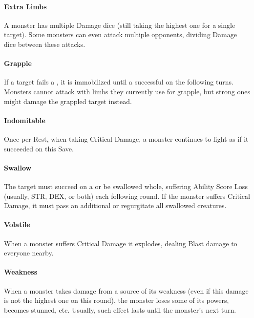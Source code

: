 \documentclass[itdr]{subfiles}
\begin{document}
\paragraph{Extra Limbs}
A monster has multiple Damage dice (still taking the highest one for a single target). Some monsters can even attack multiple opponents, dividing Damage dice between these attacks.

\paragraph{Grapple}
If a target fails a , it is immobilized until a successful  on the following turns. Monsters cannot attack with limbs they currently use for grapple, but strong ones might damage the grappled target instead.

\paragraph{Indomitable}
Once per Rest, when taking Critical Damage, a monster continues to fight as if it succeeded on this Save.

\paragraph{Swallow}
The target must succeed on a  or be swallowed whole, suffering Ability Score Loss (usually, STR, DEX, or both) each following round. If the monster suffers Critical Damage, it must pass an additional  or regurgitate all swallowed creatures.

\paragraph{Volatile}
When a monster suffers Critical Damage it explodes, dealing Blast damage to everyone nearby.

\paragraph{Weakness}
When a monster takes damage from a source of its weakness (even if this damage is not the highest one on this round), the monster loses some of its powers, becomes stunned, etc. Usually, such effect lasts until the monster's next turn.

\vfill
\break

\end{document}
